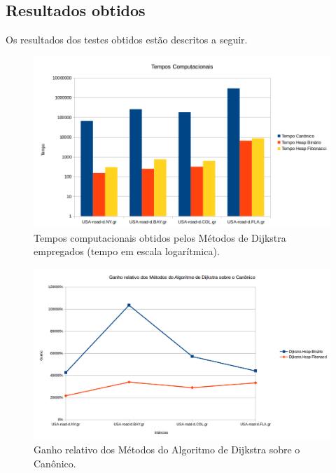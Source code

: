 \subsection{Resultados obtidos}
\label{sec-dijkstra-experimentos-resultados}
Os resultados dos testes obtidos estão descritos a seguir.

\begin{figure}[H]
\centering
\includegraphics[width=.90\textwidth]{figuras/dijkstra-tempos} 
\caption{Tempos computacionais obtidos pelos Métodos de Dijkstra empregados (tempo em escala logarítmica).}
\label{fig-dijkstra-resultados-tempos}
\end{figure}

\begin{figure}[H]
\centering
\includegraphics[width=.90\textwidth]{figuras/speed-up-dijkstra} 
\caption{Ganho relativo dos Métodos do Algoritmo de Dijkstra sobre o Canônico.}
\label{fig-dijkstra-resultados-speedup}
\end{figure}


